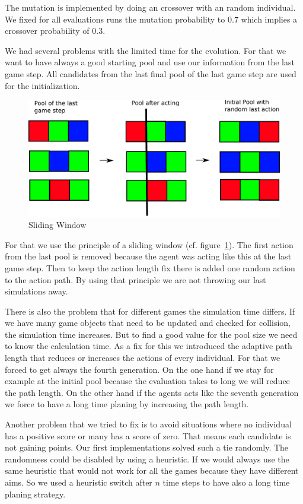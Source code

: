 The mutation is implemented by doing an crossover with an random individual.
We fixed for all evaluations runs the mutation probability to $0.7$ which implies a crossover 
probability of $0.3$.

We had several problems with the limited time for the evolution.
For that we want to have always a good starting pool and use our information from the last
game step. All candidates from the last final pool of the last game step are used for the initialization.


\begin{figure}[H]
\centering
\includegraphics[scale=0.6]{images/sliding_window.pdf}
\caption{Sliding Window}
\label{fig:sliding_window}
\end{figure}

For that we use the principle of a sliding window (cf. figure~\ref{fig:sliding_window}). The first
action from the last pool is removed because the agent was acting like this at the last game step. Then
to keep the action length fix there is added one random action to the action path.
By using that principle we are not throwing our last simulations away.

There is also the problem that for different games the simulation time differs. If we have many game objects that 
need to be updated and checked for collision, the simulation time increases.
But to find a good value for the pool size we need to know the calculation time.
As a fix for this we introduced the adaptive path length that reduces or increases the actions
of every individual.
For that we forced to get always the fourth generation. On the one hand if we stay for example at the initial
pool because the evaluation takes to long we will reduce the path length. On the other hand if the agents acts like 
the seventh generation we force to have a long time planing by increasing the path length.

Another problem that we tried to fix is to avoid situations where no individual has a positive score or many has a score of zero. That means each 
candidate is not gaining points. Our first implementations solved such a tie randomly. 
The randomness could be disabled by using a heuristic. If we would always use the same heuristic that would not work
for all the games because they have different aims. 
So we used a heuristic switch after $n$ time steps to have also a long time planing strategy.



